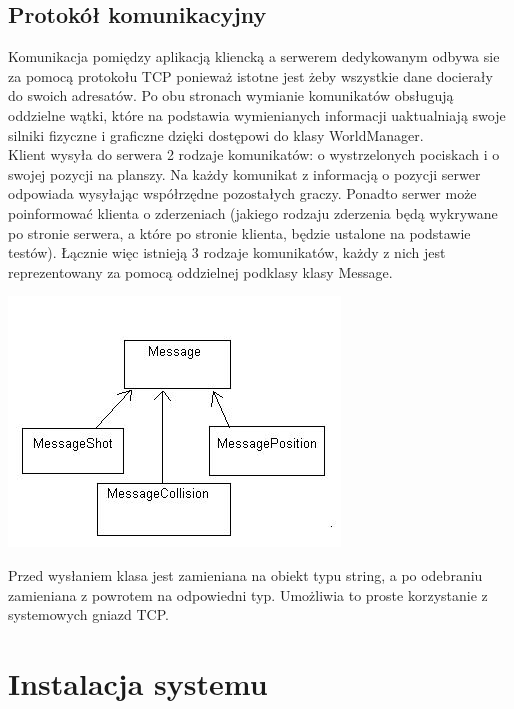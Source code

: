 \documentclass[12pt,a4paper,twoside]{article}
\begin{document}
\subsection{Protokół komunikacyjny}
Komunikacja pomiędzy aplikacją kliencką a serwerem dedykowanym odbywa sie za pomocą protokołu TCP ponieważ istotne jest żeby wszystkie dane docierały do swoich adresatów. Po obu stronach wymianie komunikatów obsługują oddzielne wątki, które na podstawia wymienianych informacji uaktualniają swoje silniki fizyczne i graficzne dzięki dostępowi do klasy WorldManager. \\
\newline
Klient wysyła do serwera 2 rodzaje komunikatów: o wystrzelonych pociskach i o swojej pozycji na planszy. Na każdy komunikat z informacją o pozycji serwer odpowiada wysyłając współrzędne pozostałych graczy. Ponadto serwer może poinformować klienta o zderzeniach (jakiego rodzaju zderzenia będą wykrywane po stronie serwera, a które po stronie klienta, będzie ustalone na podstawie testów). Łącznie więc istnieją 3 rodzaje komunikatów, każdy z nich jest reprezentowany za pomocą oddzielnej podklasy klasy Message.

\includegraphics{pics/message.jpg}

Przed wysłaniem klasa jest zamieniana na obiekt typu string, a po odebraniu zamieniana z powrotem na odpowiedni typ. Umożliwia to proste korzystanie z systemowych gniazd TCP.

\section{Instalacja systemu}

\end{document}
